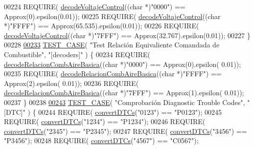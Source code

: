 \begin{DoxyCode}
{00224     REQUIRE( \hyperlink{decoders_8cpp_a5937fc059394faad8c9c96a0b27a8796}{decodeVoltajeControl}((\textcolor{keywordtype}{char} *)\textcolor{stringliteral}{"0000"}) == Approx(0).epsilon(0.01));
00225     REQUIRE( \hyperlink{decoders_8cpp_a5937fc059394faad8c9c96a0b27a8796}{decodeVoltajeControl}((\textcolor{keywordtype}{char} *)\textcolor{stringliteral}{"FFFF"}) == Approx(65.535).epsilon(0.01));
00226     REQUIRE( \hyperlink{decoders_8cpp_a5937fc059394faad8c9c96a0b27a8796}{decodeVoltajeControl}((\textcolor{keywordtype}{char} *)\textcolor{stringliteral}{"7FFF"}) == Approx(32.767).epsilon(0.01));
00227 \}
00228 
\hyperlink{UnitTestCase_8cpp_a6c2278eca15c6834d6c78885a09497c4}{00233} \hyperlink{UnitTestCase_8cpp_a094ceea8956a9b495823bde621ea759a}{TEST\_CASE}( \textcolor{stringliteral}{"Test Relación Equivaliente Comandada de Combustible"}, \textcolor{stringliteral}{"[decoders]"} ) \{
00234     REQUIRE( \hyperlink{decoders_8cpp_ade77bb9f8d8a2ba3aa431cdf9bdd0c32}{decodeRelacionCombAireBasica}((\textcolor{keywordtype}{char} *)\textcolor{stringliteral}{"0000"}) == Approx(0).epsilon(
      0.01));
00235     REQUIRE( \hyperlink{decoders_8cpp_ade77bb9f8d8a2ba3aa431cdf9bdd0c32}{decodeRelacionCombAireBasica}((\textcolor{keywordtype}{char} *)\textcolor{stringliteral}{"FFFF"}) == Approx(2).epsilon(
      0.01));
00236     REQUIRE( \hyperlink{decoders_8cpp_ade77bb9f8d8a2ba3aa431cdf9bdd0c32}{decodeRelacionCombAireBasica}((\textcolor{keywordtype}{char} *)\textcolor{stringliteral}{"7FFF"}) == Approx(1).epsilon(
      0.01));
00237 \}
00238 
\hyperlink{UnitTestCase_8cpp_a27f82a7800b27dd78331e6ee707cb5f8}{00243} \hyperlink{UnitTestCase_8cpp_a094ceea8956a9b495823bde621ea759a}{TEST\_CASE}( \textcolor{stringliteral}{"Comprobación Diagnostic Trouble Codes"}, \textcolor{stringliteral}{"[DTC]"} ) \{
00244     REQUIRE( \hyperlink{decoders_8cpp_a4f18f411252f4c60fae4af320989c262}{convertDTCs}(\textcolor{stringliteral}{"0123"}) == \textcolor{stringliteral}{"P0123"});
00245     REQUIRE( \hyperlink{decoders_8cpp_a4f18f411252f4c60fae4af320989c262}{convertDTCs}(\textcolor{stringliteral}{"1234"}) == \textcolor{stringliteral}{"P1234"});
00246     REQUIRE( \hyperlink{decoders_8cpp_a4f18f411252f4c60fae4af320989c262}{convertDTCs}(\textcolor{stringliteral}{"2345"}) == \textcolor{stringliteral}{"P2345"});
00247     REQUIRE( \hyperlink{decoders_8cpp_a4f18f411252f4c60fae4af320989c262}{convertDTCs}(\textcolor{stringliteral}{"3456"}) == \textcolor{stringliteral}{"P3456"});
00248     REQUIRE( \hyperlink{decoders_8cpp_a4f18f411252f4c60fae4af320989c262}{convertDTCs}(\textcolor{stringliteral}{"4567"}) == \textcolor{stringliteral}{"C0567"});
}
\end{DoxyCode}
